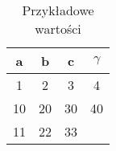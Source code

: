 \begin{table}[htbp]
\centering
\begin{tabular}{|c c c c|} 
 \hline
 a & b & c & $ \gamma $ \\ [0.5ex] 
 \hline\hline
 1 & 2 & 3 & 4 \\ 
 \hline
 10 & 20 & 30 & 40 \\
 \hline
 11 & 22 & 33 &  \\
 \hline
\end{tabular}
\label{tab:tabela4}
\caption{Przykładowe wartości}
\end{table}